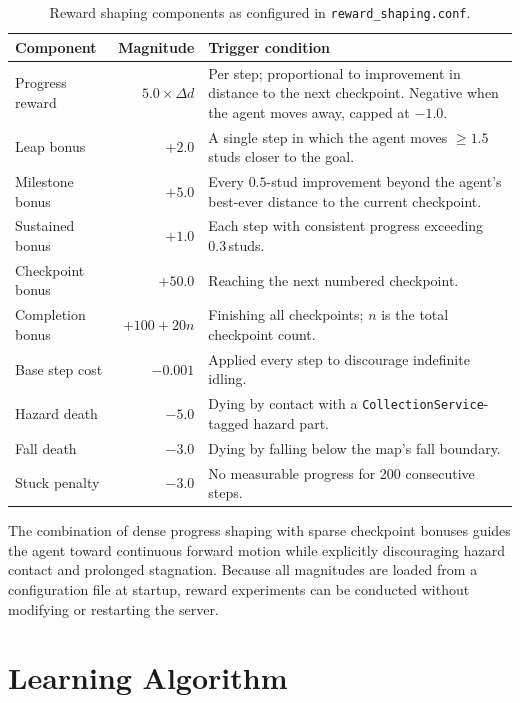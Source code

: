 \documentclass[11pt]{article}
\begin{document}
\begin{table}[htbp]
  \centering
  \caption{Reward shaping components as configured in
    \texttt{reward\_shaping.conf}.}
  \label{tab:rewards}
  \begin{tabular}{lrp{6.5cm}}
    \toprule
    Component & Magnitude & Trigger condition \\
    \midrule
    Progress reward  & $5.0 \times \Delta d$   &
      Per step; proportional to improvement in distance to the next
      checkpoint. Negative when the agent moves away, capped at
      $-1.0$. \\
    Leap bonus       & $+2.0$    &
      A single step in which the agent moves ${\geq}1.5$\,studs
      closer to the goal. \\
    Milestone bonus  & $+5.0$    &
      Every $0.5$-stud improvement beyond the agent's best-ever
      distance to the current checkpoint. \\
    Sustained bonus  & $+1.0$    &
      Each step with consistent progress exceeding $0.3$\,studs. \\
    Checkpoint bonus & $+50.0$   &
      Reaching the next numbered checkpoint. \\
    Completion bonus & $+100 + 20n$ &
      Finishing all checkpoints; $n$ is the total checkpoint count. \\
    Base step cost   & $-0.001$  &
      Applied every step to discourage indefinite idling. \\
    Hazard death     & $-5.0$    &
      Dying by contact with a \texttt{CollectionService}-tagged
      hazard part. \\
    Fall death       & $-3.0$    &
      Dying by falling below the map's fall boundary. \\
    Stuck penalty    & $-3.0$    &
      No measurable progress for 200 consecutive steps. \\
    \bottomrule
  \end{tabular}
\end{table}

The combination of dense progress shaping with sparse checkpoint bonuses
guides the agent toward continuous forward motion while explicitly
discouraging hazard contact and prolonged stagnation. Because all
magnitudes are loaded from a configuration file at startup, reward
experiments can be conducted without modifying or restarting the server.

\section{Learning Algorithm}
\label{sec:algo}
\end{document}
